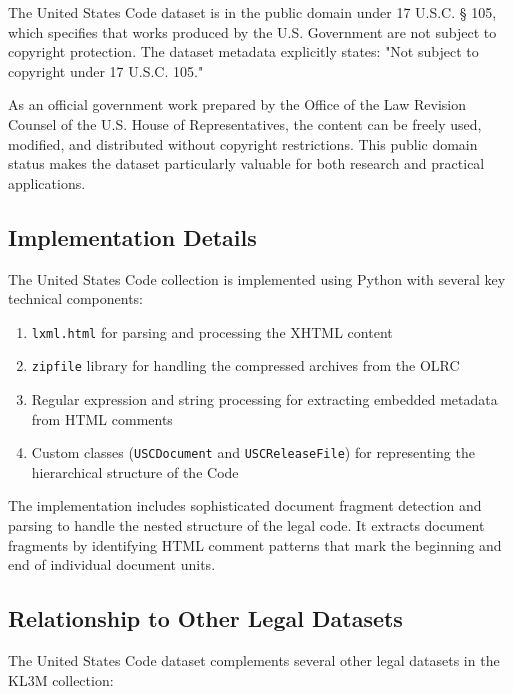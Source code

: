 The United States Code dataset is in the public domain under 17 U.S.C. § 105, which specifies that works produced by the U.S. Government are not subject to copyright protection. The dataset metadata explicitly states: "Not subject to copyright under 17 U.S.C. 105."

As an official government work prepared by the Office of the Law Revision Counsel of the U.S. House of Representatives, the content can be freely used, modified, and distributed without copyright restrictions. This public domain status makes the dataset particularly valuable for both research and practical applications.

\subsection{Implementation Details}

The United States Code collection is implemented using Python with several key technical components:

\begin{enumerate}
    \item \texttt{lxml.html} for parsing and processing the XHTML content
    
    \item \texttt{zipfile} library for handling the compressed archives from the OLRC
    
    \item Regular expression and string processing for extracting embedded metadata from HTML comments
    
    \item Custom classes (\texttt{USCDocument} and \texttt{USCReleaseFile}) for representing the hierarchical structure of the Code
\end{enumerate}

The implementation includes sophisticated document fragment detection and parsing to handle the nested structure of the legal code. It extracts document fragments by identifying HTML comment patterns that mark the beginning and end of individual document units.

\subsection{Relationship to Other Legal Datasets}

The United States Code dataset complements several other legal datasets in the KL3M collection:


